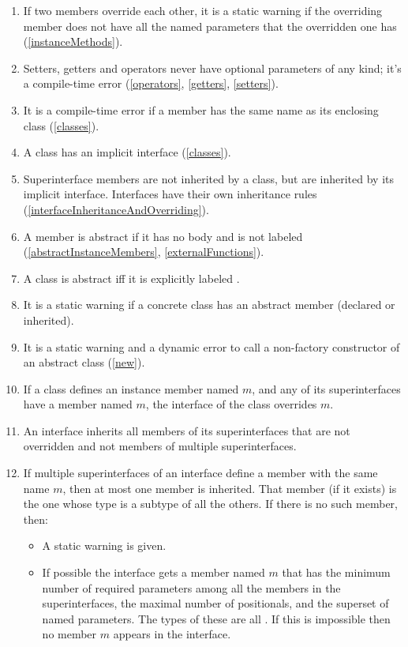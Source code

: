 \documentclass{article}
\begin{document}
{\begin{enumerate}
\item  \label{namedParams}
If two members override each other, it is a static warning if the overriding member does not have all the named parameters that the overridden one has (\ref{instanceMethods}).
\item Setters, getters and operators never have optional parameters of any kind; it's a compile-time error (\ref{operators}, \ref{getters}, \ref{setters}).
\item It is a compile-time error if a member has the same name as its enclosing class (\ref{classes}).
\item A class has an implicit interface (\ref{classes}).
\item Superinterface members are not inherited by a class, but are inherited by its implicit interface. Interfaces have their own inheritance rules (\ref{interfaceInheritanceAndOverriding}).
\item A member is abstract if it has no body and is not labeled \EXTERNAL{} (\ref{abstractInstanceMembers}, \ref{externalFunctions}).
\item A class is abstract iff it is explicitly labeled \ABSTRACT{}.%
\item It is a static warning if a concrete class has an abstract member (declared or inherited).
\item It is a static warning and a dynamic error to call a non-factory constructor of an abstract class  (\ref{new}).
\item If a class defines an instance member named $m$, and any of its superinterfaces have a  member named $m$, the interface of the class overrides $m$.
\item  An interface inherits all  members of its superinterfaces that are not overridden and not members of multiple superinterfaces.
\item  If multiple superinterfaces of an interface define a member with the same name $m$, then at most one member is inherited. That member (if it exists) is the one whose type is a subtype of all the others. If there is no such member, then:
\begin{itemize}
  \item  A static warning is given.
  \item  If possible the interface gets a member named $m$ that has the minimum number of required parameters among all the members in the superinterfaces, the maximal number of    positionals, and the superset of named parameters.  The types of these are all \DYNAMIC{}. If this is impossible then no member $m$ appears in the interface.

\end{itemize}
\end{enumerate}}
\end{document}
